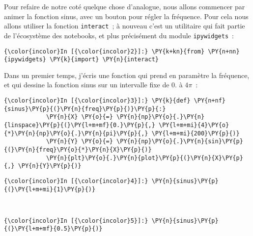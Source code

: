     Pour refaire de notre coté quelque chose d'analogue, nous allons
commencer par animer la fonction sinus, avec un bouton pour régler la
fréquence. Pour cela nous allons utiliser la fonction
\texttt{interact}~; à nouveau c'est un utilitaire qui fait partie de
l'écosystème des notebooks, et plus précisément du module
\texttt{ipywidgets}~:

    \begin{Verbatim}[commandchars=\\\{\},frame=single,framerule=0.3mm,rulecolor=\color{cellframecolor}]
{\color{incolor}In [{\color{incolor}2}]:} \PY{k+kn}{from} \PY{n+nn}{ipywidgets} \PY{k}{import} \PY{n}{interact}
\end{Verbatim}


    Dans un premier temps, j'écris une fonction qui prend en paramètre la
fréquence, et qui dessine la fonction sinus sur un intervalle fixe de 0.
à \(4\pi\)~:

    \begin{Verbatim}[commandchars=\\\{\},frame=single,framerule=0.3mm,rulecolor=\color{cellframecolor}]
{\color{incolor}In [{\color{incolor}3}]:} \PY{k}{def} \PY{n+nf}{sinus}\PY{p}{(}\PY{n}{freq}\PY{p}{)}\PY{p}{:}
            \PY{n}{X} \PY{o}{=} \PY{n}{np}\PY{o}{.}\PY{n}{linspace}\PY{p}{(}\PY{l+m+mf}{0.}\PY{p}{,} \PY{l+m+mi}{4}\PY{o}{*}\PY{n}{np}\PY{o}{.}\PY{n}{pi}\PY{p}{,} \PY{l+m+mi}{200}\PY{p}{)}
            \PY{n}{Y} \PY{o}{=} \PY{n}{np}\PY{o}{.}\PY{n}{sin}\PY{p}{(}\PY{n}{freq}\PY{o}{*}\PY{n}{X}\PY{p}{)}
            \PY{n}{plt}\PY{o}{.}\PY{n}{plot}\PY{p}{(}\PY{n}{X}\PY{p}{,} \PY{n}{Y}\PY{p}{)}
\end{Verbatim}


    \begin{Verbatim}[commandchars=\\\{\},frame=single,framerule=0.3mm,rulecolor=\color{cellframecolor}]
{\color{incolor}In [{\color{incolor}4}]:} \PY{n}{sinus}\PY{p}{(}\PY{l+m+mi}{1}\PY{p}{)}
\end{Verbatim}


    \begin{center}
    \end{center}
    { \hspace*{\fill} \\}
    
    \begin{Verbatim}[commandchars=\\\{\},frame=single,framerule=0.3mm,rulecolor=\color{cellframecolor}]
{\color{incolor}In [{\color{incolor}5}]:} \PY{n}{sinus}\PY{p}{(}\PY{l+m+mf}{0.5}\PY{p}{)}
\end{Verbatim}


